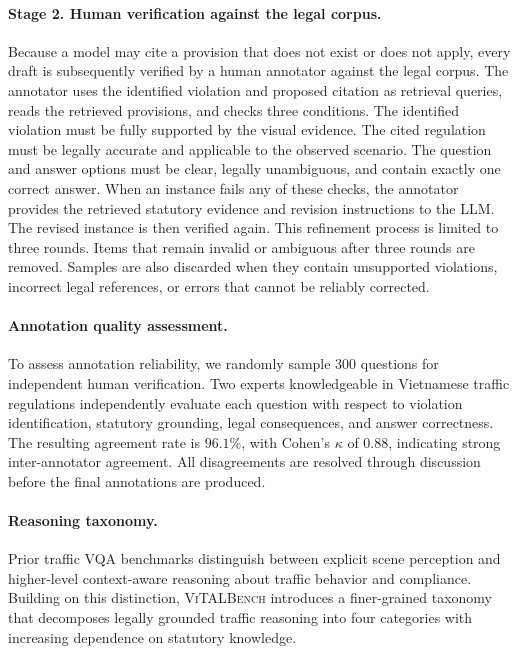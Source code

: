 \paragraph{Stage 2. Human verification against the legal corpus.}
Because a model may cite a provision that does not exist or does not apply, every draft is subsequently verified by a human annotator against the legal corpus. The annotator uses the identified violation and proposed citation as retrieval queries, reads the retrieved provisions, and checks three conditions. The identified violation must be fully supported by the visual evidence. The cited regulation must be legally accurate and applicable to the observed scenario. The question and answer options must be clear, legally unambiguous, and contain exactly one correct answer. When an instance fails any of these checks, the annotator provides the retrieved statutory evidence and revision instructions to the LLM. The revised instance is then verified again. This refinement process is limited to three rounds. Items that remain invalid or ambiguous after three rounds are removed. Samples are also discarded when they contain unsupported violations, incorrect legal references, or errors that cannot be reliably corrected.
\paragraph{Annotation quality assessment.}
To assess annotation reliability, we randomly sample 300 questions for independent human verification. Two experts knowledgeable in Vietnamese traffic regulations independently evaluate each question with respect to violation identification, statutory grounding, legal consequences, and answer correctness. The resulting agreement rate is $96.1\%$, with Cohen's $\kappa$ of $0.88$, indicating strong inter-annotator agreement. All disagreements are resolved through discussion before the final annotations are produced.

\paragraph{Reasoning taxonomy.}


Prior traffic VQA benchmarks distinguish between explicit scene perception and higher-level context-aware reasoning about traffic behavior and compliance. Building on this distinction, \textsc{ViTALBench} introduces a finer-grained taxonomy that decomposes legally grounded traffic reasoning into four categories with increasing dependence on statutory knowledge.



